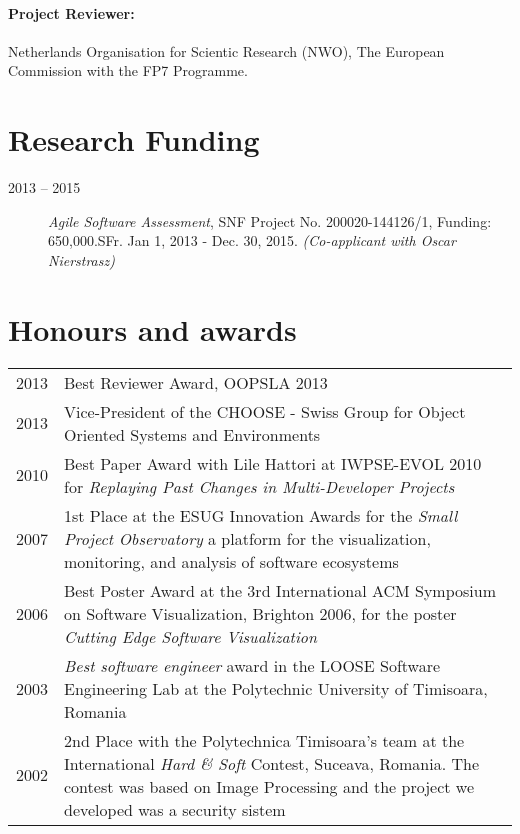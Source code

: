 \documentclass[a4paper]{article}
\begin{document}
\paragraph {Project Reviewer:}
Netherlands Organisation for Scientic Research (NWO), 
The European Commission with the FP7 Programme.

\section {Research Funding}
\begin{description}
\item [2013 -- 2015] {\em Agile Software Assessment}, SNF Project No. 200020-144126/1, Funding: 650,000.SFr.
Jan 1, 2013 - Dec. 30, 2015. {\em (Co-applicant with Oscar Nierstrasz)}
\end{description}


\section{Honours and awards}
\begin{tabular}{p{1cm}p{12cm}}

2013 & Best Reviewer Award, OOPSLA 2013 \\
2013 & Vice-President of the CHOOSE - Swiss Group for Object Oriented Systems and Environments \\
2010 & Best Paper Award with Lile Hattori at IWPSE-EVOL 2010 for {\em Replaying Past Changes in Multi-Developer Projects}\\

2007 & 1st Place at the ESUG Innovation Awards for the {\em Small Project Observatory} a platform for the visualization, monitoring, and analysis of software ecosystems\\

2006 & Best Poster Award at the 3rd International ACM Symposium on Software Visualization, Brighton 2006, for the poster {\em Cutting Edge Software Visualization} \\

2003 & {\em Best software engineer} award in the LOOSE Software Engineering Lab at the Polytechnic University of Timisoara, Romania \\

2002 & 2nd Place with the Polytechnica Timisoara's team at the International {\em Hard \& Soft} Contest, Suceava, Romania. The contest was based on Image Processing and the project we developed was a security sistem \\

%
\end{tabular}
\end{document}
